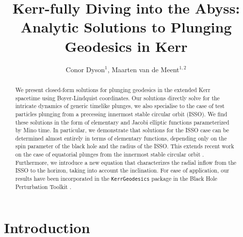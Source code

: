 \documentclass[12pt, amsmath]{revtex4-2}
\begin{document}
\title{Kerr-fully Diving into the Abyss: Analytic Solutions to Plunging Geodesics in Kerr}
\author{Conor Dyson$^1$,  Maarten van de Meent$^{1,2}$}

\address{$^1$ Niels Bohr International Academy, Niels Bohr Institute, Blegdamsvej 17, 2100 Copenhagen, Denmark}
\address{$^2$ Max Plank Institute for Gravitational Physics (Albert Einstein Institute), Potsdam-Golm, Germany}



\begin{abstract}

We present closed-form solutions for plunging geodesics in the extended Kerr spacetime using Boyer-Lindquist coordinates. Our solutions directly solve for the intricate dynamics of generic timelike plunges, we also specialise to the case of test particles plunging from a precessing innermost stable circular orbit (ISSO). We find these solutions in the form of elementary and Jacobi elliptic functions parameterized by Mino time. In particular, we demonstrate that solutions for the ISSO case can be determined almost entirely in terms of elementary functions, depending only on the spin parameter of the black hole and the radius of the ISSO. This extends recent work on the case of equatorial plunges from the innermost stable circular orbit \cite{Mummery:2022ana}. Furthermore, we introduce a new equation that characterizes the radial inflow from the ISSO to the horizon, taking into account the inclination. For ease of application, our results have been incorporated in the {\tt KerrGeodesics} package in the Black Hole Perturbation Toolkit \cite{BHPToolkit}.

\end{abstract}
\section{Introduction}
\end{document}
